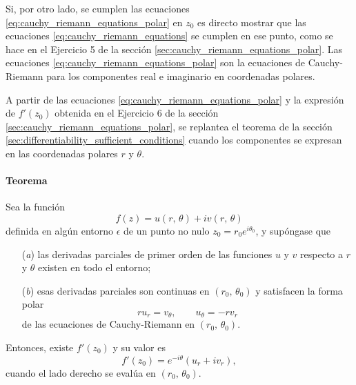 \documentclass[a4paper]{report}
\begin{document}
Si, por otro lado, se cumplen las ecuaciones \ref{eq:cauchy_riemann_equations_polar} en \(z_0\) es directo mostrar que las ecuaciones \ref{eq:cauchy_riemann_equations} se cumplen en ese punto, como se hace en el Ejercicio 5 de la sección \ref{sec:cauchy_riemann_equations_polar}. Las ecuaciones \ref{eq:cauchy_riemann_equations_polar} son la ecuaciones de Cauchy-Riemann para los componentes real e imaginario en coordenadas polares.

A partir de las ecuaciones \ref{eq:cauchy_riemann_equations_polar} y la expresión de \(f'(z_0)\) obtenida en el Ejercicio 6 de la sección \ref{sec:cauchy_riemann_equations_polar}, se replantea el teorema de la sección \ref{sec:differentiability_sufficient_conditions} cuando los componentes se expresan en las coordenadas polares \(r\) y \(\theta\).

\paragraph{Teorema} Sea la función
\[
 f(z)=u(r,\,\theta)+iv(r,\,\theta)
\]
definida en algún entorno \(\epsilon\) de un punto no nulo \(z_0=r_0e^{i\theta_0}\), y supóngase que 
\begin{enumerate}
 \item[(\textit{a})] las derivadas parciales de primer orden de las funciones \(u\) y \(v\) respecto a \(r\) y \(\theta\) existen en todo el entorno;
 \item[(\textit{b})] esas derivadas parciales son continuas en \((r_0,\,\theta_0)\) y satisfacen la forma polar
 \[
 ru_r=v_\theta ,
 \qquad
 u_\theta=-rv_r
\]
de las ecuaciones de Cauchy-Riemann en \((r_0,\,\theta_0)\).  
\end{enumerate}
Entonces, existe \(f'(z_0)\) y su valor es
\[
 f'(z_0)=e^{-i\theta}(u_r+iv_r),
\]
cuando el lado derecho se evalúa en \((r_0,\,\theta_0)\).
\end{document}

